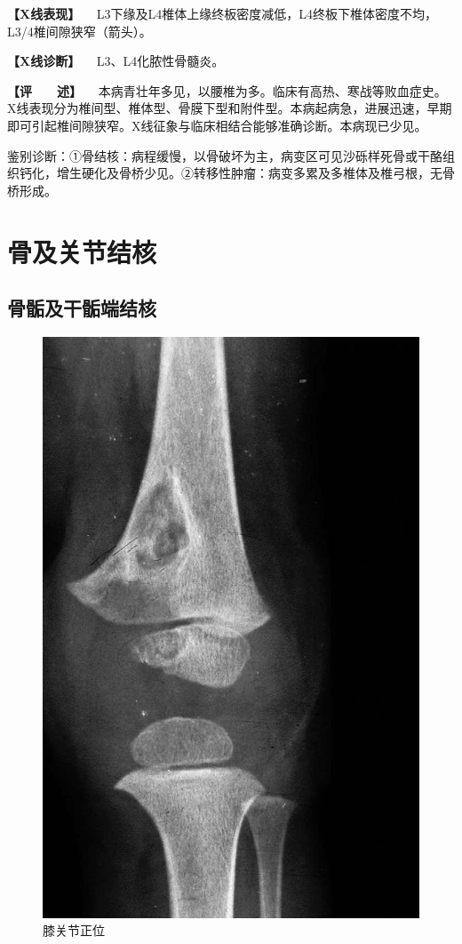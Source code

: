 \textbf{【X线表现】}
　L3下缘及L4椎体上缘终板密度减低，L4终板下椎体密度不均，L3/4椎间隙狭窄（箭头）。

\textbf{【X线诊断】} 　L3、L4化脓性骨髓炎。

\textbf{【评　　述】}
　本病青壮年多见，以腰椎为多。临床有高热、寒战等败血症史。X线表现分为椎间型、椎体型、骨膜下型和附件型。本病起病急，进展迅速，早期即可引起椎间隙狭窄。X线征象与临床相结合能够准确诊断。本病现已少见。

鉴别诊断：①骨结核：病程缓慢，以骨破坏为主，病变区可见沙砾样死骨或干酪组织钙化，增生硬化及骨桥少见。②转移性肿瘤：病变多累及多椎体及椎弓根，无骨桥形成。

\section{骨及关节结核}

\subsection{骨骺及干骺端结核}

\begin{figure}[!htbp]
 \centering
 \includegraphics{./images/Image00076.jpg}
 \captionsetup{justification=centering}
 \caption{膝关节正位}
 \label{fig2-6-1}
  \end{figure} 

